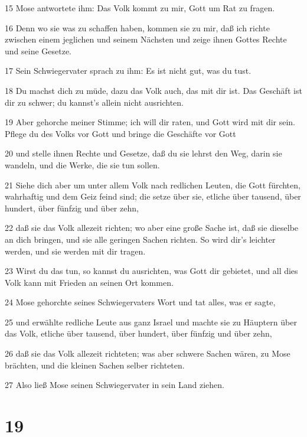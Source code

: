 \par 15 Mose antwortete ihm: Das Volk kommt zu mir, Gott um Rat zu fragen.
\par 16 Denn wo sie was zu schaffen haben, kommen sie zu mir, daß ich richte zwischen einem jeglichen und seinem Nächsten und zeige ihnen Gottes Rechte und seine Gesetze.
\par 17 Sein Schwiegervater sprach zu ihm: Es ist nicht gut, was du tust.
\par 18 Du machst dich zu müde, dazu das Volk auch, das mit dir ist. Das Geschäft ist dir zu schwer; du kannst's allein nicht ausrichten.
\par 19 Aber gehorche meiner Stimme; ich will dir raten, und Gott wird mit dir sein. Pflege du des Volks vor Gott und bringe die Geschäfte vor Gott
\par 20 und stelle ihnen Rechte und Gesetze, daß du sie lehrst den Weg, darin sie wandeln, und die Werke, die sie tun sollen.
\par 21 Siehe dich aber um unter allem Volk nach redlichen Leuten, die Gott fürchten, wahrhaftig und dem Geiz feind sind; die setze über sie, etliche über tausend, über hundert, über fünfzig und über zehn,
\par 22 daß sie das Volk allezeit richten; wo aber eine große Sache ist, daß sie dieselbe an dich bringen, und sie alle geringen Sachen richten. So wird dir's leichter werden, und sie werden mit dir tragen.
\par 23 Wirst du das tun, so kannst du ausrichten, was Gott dir gebietet, und all dies Volk kann mit Frieden an seinen Ort kommen.
\par 24 Mose gehorchte seines Schwiegervaters Wort und tat alles, was er sagte,
\par 25 und erwählte redliche Leute aus ganz Israel und machte sie zu Häuptern über das Volk, etliche über tausend, über hundert, über fünfzig und über zehn,
\par 26 daß sie das Volk allezeit richteten; was aber schwere Sachen wären, zu Mose brächten, und die kleinen Sachen selber richteten.
\par 27 Also ließ Mose seinen Schwiegervater in sein Land ziehen.

\chapter{19}

